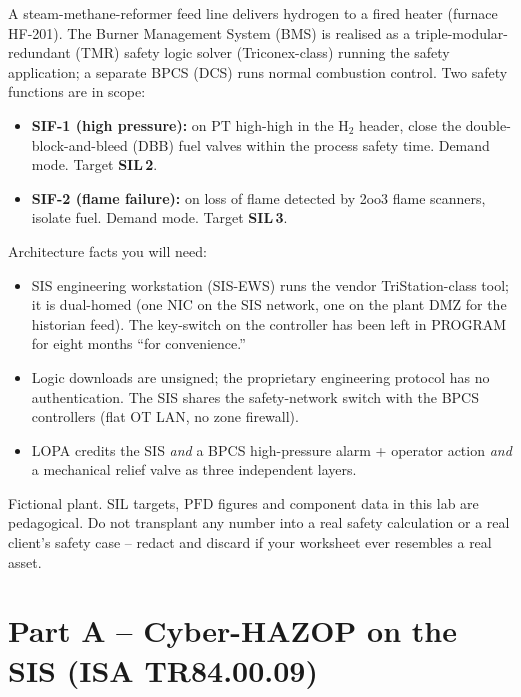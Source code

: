\documentclass[11pt,a4paper]{article}
\begin{document}
\begin{notebox}
A steam-methane-reformer feed line delivers hydrogen to a fired heater
(furnace HF-201). The Burner Management System (BMS) is realised as a
triple-modular-redundant (TMR) safety logic solver (Triconex-class) running
the safety application; a separate BPCS (DCS) runs normal combustion control.
Two safety functions are in scope:

\begin{itemize}[leftmargin=1.4em]\setlength{\itemsep}{1pt}
  \item \textbf{SIF-1 (high pressure):} on $\mathrm{PT}$ high-high in the
        H$_2$ header, close the double-block-and-bleed (DBB) fuel valves
        within the process safety time. Demand mode. Target \textbf{SIL\,2}.
  \item \textbf{SIF-2 (flame failure):} on loss of flame detected by 2oo3
        flame scanners, isolate fuel. Demand mode. Target \textbf{SIL\,3}.
\end{itemize}

Architecture facts you will need:
\begin{itemize}[leftmargin=1.4em]\setlength{\itemsep}{1pt}
  \item SIS engineering workstation (SIS-EWS) runs the vendor TriStation-class
        tool; it is dual-homed (one NIC on the SIS network, one on the plant
        DMZ for the historian feed). The key-switch on the controller has been
        left in PROGRAM for eight months ``for convenience.''
  \item Logic downloads are unsigned; the proprietary engineering protocol has
        no authentication. The SIS shares the safety-network switch with the
        BPCS controllers (flat OT LAN, no zone firewall).
  \item LOPA credits the SIS \emph{and} a BPCS high-pressure alarm + operator
        action \emph{and} a mechanical relief valve as three independent layers.
\end{itemize}
\end{notebox}

\begin{warnbox}
Fictional plant. SIL targets, $\mathrm{PFD}$ figures and component data in
this lab are pedagogical. Do not transplant any number into a real safety
calculation or a real client's safety case -- redact and discard if your
worksheet ever resembles a real asset.
\end{warnbox}

\section*{Part A -- Cyber-HAZOP on the SIS (ISA TR84.00.09)}
\end{document}
